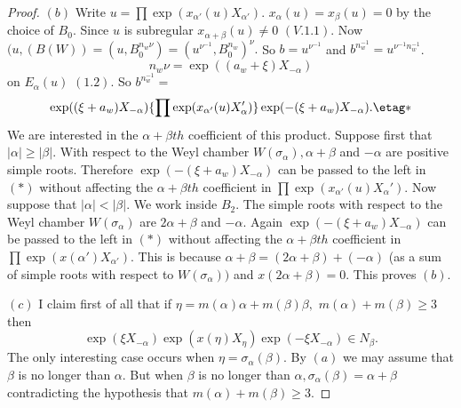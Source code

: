 \documentclass{memo-l}
\theoremstyle{definition}
\theoremstyle{remark}
\numberwithin{section}{chapter}
\numberwithin{equation}{chapter}
\begin{document}
\begin{proof}
   $(b)$ Write $u = \prod \exp(x_{{\alpha}'}(u)X_{{\alpha}'})$.  
$x_{{\alpha}}(u) = x_{{\beta}}(u) = 0$
by the choice of $B_{0}$.  Since $u$ is subregular
$x_{{\alpha}+{\beta}}(u) \ne 0$ $(V.1.1)$.  Now $(u,(B(W)) = 
(u,B_{0}^{n_{w}{\nu}}) = (u^{{\nu}^{-1}},B_{0}^{n_w})^\nu.$ So 
$b = u^{{\nu}^{-1}}$ and $b^{n_{w}^{-1}} =
u^{{\nu}^{-1}n_{w}^{-1}}$.  $$n_{w}{\nu} =
\exp((a_{w}+{\xi})X_{-{\alpha}})$$ on $E_{{\alpha}}(u)$ $(1.2)$.  So 
$b^{n_{w}^{-1}} =$
$$
\exp(({\xi}+a_{w})X_{-{\alpha}})\{ \prod \exp(x_{{\alpha}'}(u)X_{{\alpha}}')\} 
\exp(-({\xi}+a_{w})X_{-{\alpha}}) .   \etag *
$$
We are interested in the ${\alpha}+{\beta}th$ coefficient of this product.
Suppose first that $\vert {\alpha}\vert \ge \vert {\beta}\vert .$ With
respect to the Weyl chamber $W({\sigma}_{{\alpha}}), {\alpha}+{\beta}$ and
$-{\alpha}$ are positive simple roots.  Therefore
$\exp(-({\xi}+a_{w})X_{-{\alpha}})$ can be passed to the left in $(*)$
without affecting the ${\alpha}+{\beta}th$ coefficient in 
$\prod \exp(x_{{\alpha}'}(u)X_{{\alpha}}')$.
Now suppose that $\vert {\alpha}\vert < \vert {\beta}\vert .$ We work
inside $B_{2}$.  The simple roots with respect to the Weyl chamber
$W({\sigma}_{{\alpha}})$ are $2{\alpha}+{\beta}$ and $-{\alpha}$.  Again
$\exp(-({\xi}+a_{w})X_{-{\alpha}})$ can be passed to the left in $(*)$
without affecting the ${\alpha}+{\beta}th$ coefficient in 
$\prod \exp(x({\alpha}')X_{{\alpha}'})$.
This is because ${\alpha}+{\beta} = (2{\alpha}+{\beta}) + (-{\alpha})$ (as
a sum of simple roots with respect to $W({\sigma}_{{\alpha}}))$ and
$x(2{\alpha}+{\beta}) = 0$.  This proves $(b)$.

   $(c)$ I claim first of all that if
${\eta} = m({\alpha}){\alpha}+m({\beta}){\beta},$ $m({\alpha})+m({\beta}) \ge 3$ 
then 
$$\exp({\xi}X_{-{\alpha}})\exp(x({\eta})X_{{\eta}})\exp(-{\xi}X_{-{\alpha}})
 \in  N_{{\beta}}.$$  The only interesting case occurs when
${\eta} = {\sigma}_{{\alpha}}({\beta})$.  By $(a)$ we may assume that
${\beta}$ is no longer than ${\alpha}$.  But when ${\beta}$ is no longer
than ${\alpha}, {\sigma}_{{\alpha}}({\beta}) = {\alpha}+{\beta}$
contradicting the hypothesis that $m({\alpha})+m({\beta}) \ge 3$.



\end{proof}
\end{document}
